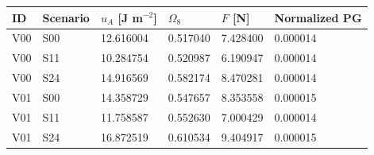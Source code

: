 \begin{tabular}{llllll}
\toprule
ID & Scenario & $u_A$ [J m$^{-2}$] & $\Omega_8$ & $F$ [N] & Normalized PG \\
\midrule
V00 & S00 & 12.616004 & 0.517040 & 7.428400 & 0.000014 \\
V00 & S11 & 10.284754 & 0.520987 & 6.190947 & 0.000014 \\
V00 & S24 & 14.916569 & 0.582174 & 8.470281 & 0.000014 \\
V01 & S00 & 14.358729 & 0.547657 & 8.353558 & 0.000015 \\
V01 & S11 & 11.758587 & 0.552630 & 7.000429 & 0.000014 \\
V01 & S24 & 16.872519 & 0.610534 & 9.404917 & 0.000015 \\
\bottomrule
\end{tabular}
